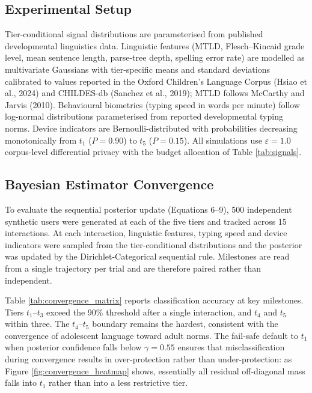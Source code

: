 \documentclass[fleqn,10pt]{wlscirep}
\begin{document}
\subsection*{Experimental Setup}

Tier-conditional signal distributions are parameterised from published developmental linguistics data. Linguistic features (MTLD, Flesch--Kincaid grade level, mean sentence length, parse-tree depth, spelling error rate) are modelled as multivariate Gaussians with tier-specific means and standard deviations calibrated to values reported in the Oxford Children's Language Corpus (Hsiao et al., 2024)\cite{Hsiao2024} and CHILDES-db (Sanchez et al., 2019)\cite{Sanchez2019}; MTLD follows McCarthy and Jarvis (2010)\cite{McCarthy2010}. Behavioural biometrics (typing speed in words per minute) follow log-normal distributions parameterised from reported developmental typing norms. Device indicators are Bernoulli-distributed with probabilities decreasing monotonically from $t_1$ ($P = 0.90$) to $t_5$ ($P = 0.15$). All simulations use $\varepsilon = 1.0$ corpus-level differential privacy with the budget allocation of Table \ref{tab:signals}.

\subsection*{Bayesian Estimator Convergence}

To evaluate the sequential posterior update (Equations 6--9), 500 independent synthetic users were generated at each of the five tiers and tracked across 15 interactions. At each interaction, linguistic features, typing speed and device indicators were sampled from the tier-conditional distributions and the posterior was updated by the Dirichlet-Categorical sequential rule. Milestones are read from a single trajectory per trial and are therefore paired rather than independent.

Table \ref{tab:convergence_matrix} reports classification accuracy at key milestones. Tiers $t_1$--$t_3$ exceed the 90\% threshold after a single interaction, and $t_4$ and $t_5$ within three. The $t_4$--$t_5$ boundary remains the hardest, consistent with the convergence of adolescent language toward adult norms. The fail-safe default to $t_1$ when posterior confidence falls below $\gamma = 0.55$ ensures that misclassification during convergence results in over-protection rather than under-protection: as Figure \ref{fig:convergence_heatmap} shows, essentially all residual off-diagonal mass falls into $t_1$ rather than into a less restrictive tier.
\end{document}
